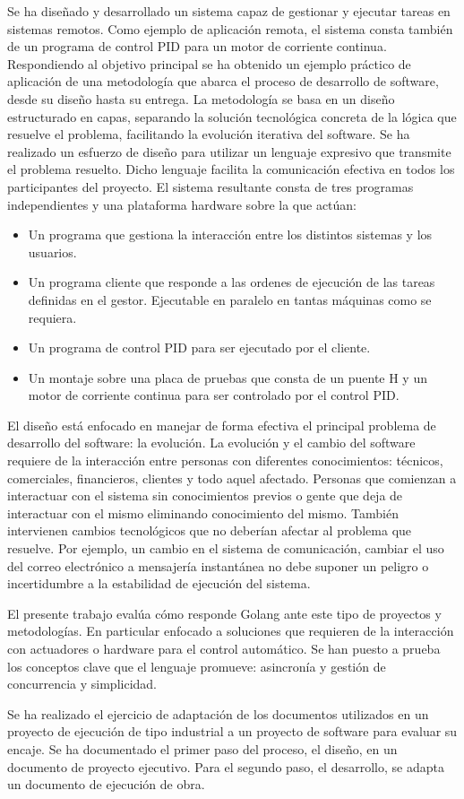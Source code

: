 
Se ha diseñado y desarrollado un sistema capaz de gestionar y ejecutar tareas en sistemas remotos.
Como ejemplo de aplicación remota, el sistema consta también de un programa de control PID para un motor de corriente continua.
Respondiendo al objetivo principal se ha obtenido un ejemplo práctico de aplicación de una metodología que abarca el proceso de desarrollo de software, desde su diseño hasta su entrega.
La metodología se basa en un diseño estructurado en capas, separando la solución tecnológica concreta de la lógica que resuelve el problema, facilitando la evolución iterativa del software.
Se ha realizado un esfuerzo de diseño para utilizar un lenguaje expresivo que transmite el problema resuelto.
Dicho lenguaje facilita la comunicación efectiva en todos los participantes del proyecto.
El sistema resultante consta de tres programas independientes y una plataforma hardware sobre la que actúan:

\begin{itemize}
    \item Un programa que gestiona la interacción entre los distintos sistemas y los usuarios.
    \item Un programa cliente que responde a las ordenes de ejecución de las tareas definidas en el gestor.
    Ejecutable en paralelo en tantas máquinas como se requiera.
    \item Un programa de control PID para ser ejecutado por el cliente.
    \item Un montaje sobre una placa de pruebas que consta de un puente H y un motor de corriente continua para ser controlado por el control PID\@.
\end{itemize}

El diseño está enfocado en manejar de forma efectiva el principal problema de desarrollo del software: la evolución.
La evolución y el cambio del software requiere de la interacción entre personas con diferentes conocimientos: técnicos, comerciales, financieros, clientes y todo aquel afectado.
Personas que comienzan a interactuar con el sistema sin conocimientos previos o gente que deja de interactuar con el mismo eliminando conocimiento del mismo.
También intervienen cambios tecnológicos que no deberían afectar al problema que resuelve.
Por ejemplo, un cambio en el sistema de comunicación, cambiar el uso del correo electrónico a mensajería instantánea no debe suponer un peligro o incertidumbre a la estabilidad de ejecución del sistema.

El presente trabajo evalúa cómo responde Golang ante este tipo de proyectos y metodologías.
En particular enfocado a soluciones que requieren de la interacción con actuadores o hardware para el control automático.
Se han puesto a prueba los conceptos clave que el lenguaje promueve: asincronía y gestión de concurrencia y simplicidad.

Se ha realizado el ejercicio de adaptación de los documentos utilizados en un proyecto de ejecución de tipo industrial a un proyecto de software para evaluar su encaje.
Se ha documentado el primer paso del proceso, el diseño, en un documento de proyecto ejecutivo.
Para el segundo paso, el desarrollo, se adapta un documento de ejecución de obra.



